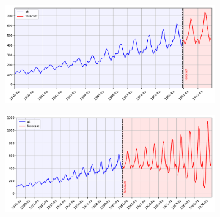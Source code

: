 \documentclass{article}
\begin{document}
\begin{figure}
  \begin{subfigure}{0.5\textwidth}
    \centering
    \includegraphics[scale=0.23]{figures/fig9}
    \caption{}
    \label{fig:f9}
  \end{subfigure}%
  \begin{subfigure}{0.5\textwidth}
    \centering
    \includegraphics[scale=0.23]{figures/fig10}
    \caption{}
    \label{fig:f10}
  \end{subfigure}


\end{figure}
\end{document}
